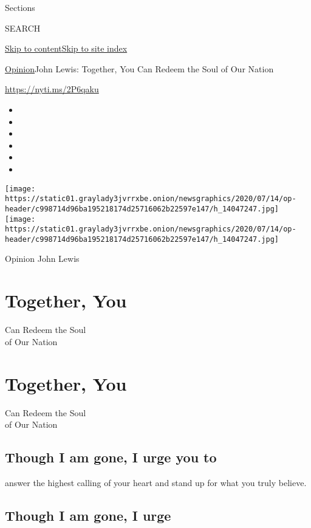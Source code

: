 Sections

SEARCH

\protect\hyperlink{site-content}{Skip to
content}\protect\hyperlink{site-index}{Skip to site index}

\href{/section/opinion}{Opinion}\textbar{}John Lewis: Together, You Can
Redeem the Soul of Our Nation

\href{https://nyti.ms/2P6qaku}{https://nyti.ms/2P6qaku}

\begin{itemize}
\item
\item
\item
\item
\item
\item
\end{itemize}

\texttt{[image: https://static01.graylady3jvrrxbe.onion/newsgraphics/2020/07/14/op-header/c998714d96ba195218174d25716062b22597e147/h\_14047247.jpg]}
\texttt{[image: https://static01.graylady3jvrrxbe.onion/newsgraphics/2020/07/14/op-header/c998714d96ba195218174d25716062b22597e147/h\_14047247.jpg]}

Opinion John Lewis

\hypertarget{together-you}{%
\section{Together, You}\label{together-you}}

Can Redeem the Soul\\
of Our Nation

\hypertarget{together-you-1}{%
\section{Together, You}\label{together-you-1}}

Can Redeem the Soul\\
of Our Nation

\hypertarget{though-i-am-gone-i-urge-you-to}{%
\subsection{Though I am gone, I urge you
to}\label{though-i-am-gone-i-urge-you-to}}

answer the highest calling of your heart and stand up for what you truly
believe.

\hypertarget{though-i-am-gone-i-urge}{%
\subsection{Though I am gone, I urge}\label{though-i-am-gone-i-urge}}

